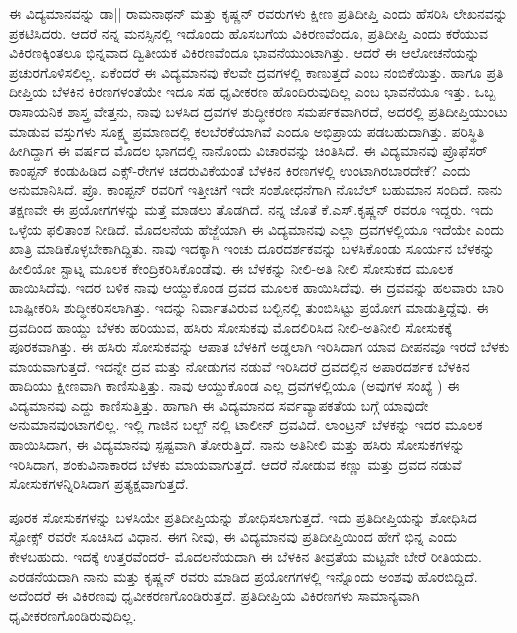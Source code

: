 ಈ ವಿದ್ಯಮಾನವನ್ನು ಡಾ|| ರಾಮನಾಥನ್ ಮತ್ತು ಕೃಷ್ಣನ್ ರವರುಗಳು ಕ್ಷೀಣ ಪ್ರತಿದೀಪ್ತಿ ಎಂದು ಹೆಸರಿಸಿ ಲೇಖನವನ್ನು ಪ್ರಕಟಿಸಿದರು. ಆದರೆ ನನ್ನ ಮನಸ್ಸಿನಲ್ಲಿ ಇದೊಂದು ಹೊಸಬಗೆಯ ವಿಕಿರಣವೆಂದೂ, ಪ್ರತಿದೀಪ್ತಿ ಎಂದು ಕರೆಯುವ ವಿಕಿರಣಕ್ಕಿಂತಲೂ ಭಿನ್ನವಾದ ದ್ವಿತೀಯಕ ವಿಕಿರಣವೆಂದೂ ಭಾವನೆಯುಂಟಾಗಿತ್ತು. ಆದರೆ ಈ ಆಲೋಚನೆಯನ್ನು ಪ್ರಚುರಗೊಳಿಸಲಿಲ್ಲ. ಏಕೆಂದರೆ ಈ ವಿದ್ಯಮಾನವು ಕೆಲವೇ ದ್ರವಗಳಲ್ಲಿ ಕಾಣುತ್ತದೆ ಎಂಬ ನಂಬಿಕೆಯಿತ್ತು. ಹಾಗೂ ಪ್ರತಿ ದೀಪ್ತಿಯ ಬೆಳಕಿನ ಕಿರಣಗಳಂತೆಯೇ ಇದೂ ಸಹ ಧೃವೀಕರಣ ಹೊಂದಿರುವುದಿಲ್ಲ ಎಂಬ ಭಾವನೆಯೂ ಇತ್ತು. ಒಬ್ಬ ರಾಸಾಯನಿಕ ಶಾಸ್ತ್ರ ವೇತ್ತನು, ನಾವು ಬಳಸಿದ ದ್ರವಗಳ ಶುದ್ಧೀಕರಣ ಸಮರ್ಪಕವಾಗಿರದೆ, ಅದರಲ್ಲಿ ಪ್ರತಿದೀಪ್ತಿಯುಂಟು ಮಾಡುವ ವಸ್ತುಗಳು ಸೂಕ್ಷ್ಮ ಪ್ರಮಾಣದಲ್ಲಿ ಕಲಬೆರಕೆಯಾಗಿವೆ ಎಂದೂ ಅಭಿಪ್ರಾಯ ಪಡಬಹುದಾಗಿತ್ತು. ಪರಿಸ್ಥಿತಿ ಹೀಗಿದ್ದಾಗ ಈ ವರ್ಷದ ಮೊದಲ ಭಾಗದಲ್ಲಿ ನಾನೊಂದು ವಿಚಾರವನ್ನು ಚಿಂತಿಸಿದೆ. ಈ ವಿದ್ಯಮಾನವು ಪ್ರೊಫೆಸರ್ ಕಾಂಪ್ಟನ್ ಕಂಡುಹಿಡಿದ ಎಕ್ಸ್-ರೇಗಳ ಚದರುವಿಕೆಯಂತೆ ಬೆಳಕಿನ ಕಿರಣಗಳಲ್ಲಿ ಉಂಟಾಗಿರಬಾರದೇಕೆ? ಎಂದು ಅನುಮಾನಿಸಿದೆ. ಪ್ರೊ. ಕಾಂಪ್ಟನ್ ರವರಿಗೆ ಇತ್ತೀಚಿಗೆ ಇದೇ ಸಂಶೋಧನೆಗಾಗಿ ನೊಬೆಲ್ ಬಹುಮಾನ ಸಂದಿದೆ. ನಾನು ತಕ್ಷಣವೇ ಈ ಪ್ರಯೋಗಗಳನ್ನು ಮತ್ತೆ ಮಾಡಲು ತೊಡಗಿದೆ. ನನ್ನ ಜೊತೆ ಕೆ.ಎಸ್.ಕೃಷ್ಣನ್ ರವರೂ ಇದ್ದರು. ಇದು ಒಳ್ಳೆಯ ಫಲಿತಾಂಶ ನೀಡಿದೆ. ಮೊದಲನೆಯ ಹೆಜ್ಜೆಯಾಗಿ ಈ ವಿದ್ಯಮಾನವು ಎಲ್ಲಾ ದ್ರವಗಳಲ್ಲಿಯೂ ಇದೆಯೇ ಎಂದು ಖಾತ್ರಿ ಮಾಡಿಕೊಳ್ಳಬೇಕಾಗಿದ್ದಿತು. ನಾವು ಇದಕ್ಕಾಗಿ  ಇಂಚು ದೂರದರ್ಶಕವನ್ನು ಬಳಸಿಕೊಂಡು ಸೂರ್ಯನ ಬೆಳಕನ್ನು ಹೀಲಿಯೋ ಸ್ಟಾಟ್ನ ಮೂಲಕ ಕೇಂದ್ರಿಕರಿಸಿಕೊಂಡೆವು. ಈ ಬೆಳಕನ್ನು ನೀಲಿ-ಅತಿ ನೀಲಿ ಸೋಸುಕದ ಮೂಲಕ ಹಾಯಿಸಿದೆವು. ಇದರ ಬಳಿಕ ನಾವು ಆಯ್ದುಕೊಂಡ ದ್ರವದ ಮೂಲಕ ಹಾಯಿಸಿದೆವು. ಈ ದ್ರವವನ್ನು ಹಲವಾರು ಬಾರಿ ಬಾಷ್ಪೀಕರಿಸಿ ಶುದ್ಧೀಕರಿಸಲಾಗಿತ್ತು. ಇದನ್ನು ನಿರ್ವಾತವಿರುವ ಬಲ್ಬಿನಲ್ಲಿ ತುಂಬಿಸಿಟ್ಟು ಪ್ರಯೋಗ ಮಾಡುತ್ತಿದ್ದೆವು. ಈ ದ್ರವದಿಂದ ಹಾಯ್ದು ಬೆಳಕು ಹರಿಯುವ, ಹಸಿರು ಸೋಸುಕವು ಮೊದಲಿರಿಸಿದ ನೀಲಿ-ಅತಿನೀಲಿ ಸೋಸುಕಕ್ಕೆ ಪೂರಕವಾಗಿತ್ತು. ಈ ಹಸಿರು ಸೋಸುಕವನ್ನು ಆಪಾತ ಬೆಳಕಿಗೆ ಅಡ್ಡಲಾಗಿ ಇರಿಸಿದಾಗ ಯಾವ ದೀಪನವೂ ಇರದೆ ಬೆಳಕು ಮಾಯವಾಗುತ್ತದೆ. ಇದನ್ನೇ ದ್ರವ ಮತ್ತು ನೋಡುಗನ ನಡುವೆ ಇರಿಸಿದರೆ ದ್ರವದಲ್ಲಿನ ಅಪಾರದರ್ಶಕ ಬೆಳಕಿನ ಹಾದಿಯು ಕ್ಷೀಣವಾಗಿ ಕಾಣಿಸುತ್ತಿತ್ತು. ನಾವು ಆಯ್ದುಕೊಂಡ ಎಲ್ಲ ದ್ರವಗಳಲ್ಲಿಯೂ (ಅವುಗಳ ಸಂಖ್ಯೆ ) ಈ ವಿದ್ಯಮಾನವು ಎದ್ದು ಕಾಣಿಸುತ್ತಿತ್ತು. ಹಾಗಾಗಿ ಈ ವಿದ್ಯಮಾನದ ಸರ್ವವ್ಯಾಪಕತೆಯ ಬಗ್ಗೆ ಯಾವುದೇ ಅನುಮಾನವುಂಟಾಗಲಿಲ್ಲ. ಇಲ್ಲಿ ಗಾಜಿನ ಬಲ್ಬ್ ನಲ್ಲಿ ಟಾಲೀನ್ ದ್ರವವಿದೆ. ಲಾಂಟ್ರನ್ ಬೆಳಕನ್ನು ಇದರ ಮೂಲಕ ಹಾಯಿಸಿದಾಗ, ಈ ವಿದ್ಯಮಾನವು ಸ್ಪಷ್ಟವಾಗಿ ತೋರುತ್ತಿದೆ. ನಾನು ಅತಿನೀಲಿ ಮತ್ತು ಹಸಿರು ಸೋಸುಕಗಳನ್ನು ಇರಿಸಿದಾಗ, ಶಂಕುವಿನಾಕಾರದ ಬೆಳಕು ಮಾಯವಾಗುತ್ತದೆ. ಆದರೆ ನೋಡುವ ಕಣ್ಣು ಮತ್ತು ದ್ರವದ ನಡುವೆ ಸೋಸುಕಗಳನ್ನಿರಿಸಿದಾಗ ಪ್ರತ್ಯಕ್ಷವಾಗುತ್ತದೆ.

ಪೂರಕ ಸೋಸುಕಗಳನ್ನು ಬಳಸಿಯೇ ಪ್ರತಿದೀಪ್ತಿಯನ್ನು ಶೋಧಿಸಲಾಗುತ್ತದೆ. ಇದು ಪ್ರತಿದೀಪ್ತಿಯನ್ನು ಶೋಧಿಸಿದ ಸ್ಟೋಕ್ಸ್ ರವರೇ ಸೂಚಿಸಿದ ವಿಧಾನ. ಈಗ ನೀವು, ಈ ವಿದ್ಯಮಾನವು ಪ್ರತಿದೀಪ್ತಿಯಿಂದ ಹೇಗೆ ಭಿನ್ನ ಎಂದು ಕೇಳಬಹುದು. ಇದಕ್ಕೆ ಉತ್ತರವೆಂದರೆ- ಮೊದಲನೆಯದಾಗಿ ಈ ಬೆಳಕಿನ ತೀವ್ರತೆಯ ಮಟ್ಟವೇ ಬೇರೆ ರೀತಿಯದು. ಎರಡನೆಯದಾಗಿ ನಾನು ಮತ್ತು ಕೃಷ್ಣನ್ ರವರು ಮಾಡಿದ ಪ್ರಯೋಗಗಳಲ್ಲಿ ಇನ್ನೊಂದು ಅಂಶವು ಹೊರಬಿದ್ದಿದೆ. ಅದೆಂದರೆ ಈ ವಿಕಿರಣವು ಧೃವೀಕರಣಗೊಂಡಿರುತ್ತದೆ. ಪ್ರತಿದೀಪ್ತಿಯ ವಿಕಿರಣಗಳು ಸಾಮಾನ್ಯವಾಗಿ ಧೃವೀಕರಣಗೊಂಡಿರುವುದಿಲ್ಲ.


